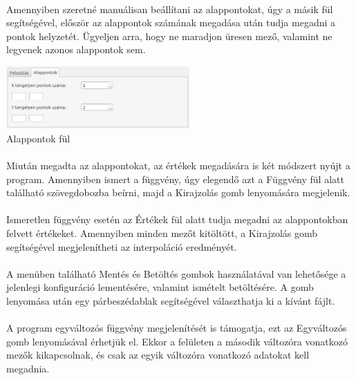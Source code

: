 \documentclass[12pt]{report}
\begin{document}
\paragraph{}
Amennyiben szeretné manuálisan beállítani az alappontokat, úgy a másik fül segítségével, először az alappontok számának megadása után tudja megadni a pontok helyzetét. Ügyeljen arra, hogy ne maradjon üresen mező, valamint ne legyenek azonos alappontok sem.
\begin{center}
\includegraphics[width=7cm]{pics/gui/partition2}  \\
{\footnotesize Alappontok fül} 
\end{center}
\paragraph{}
Miután megadta az alappontokat, az értékek megadására is két módszert nyújt a program. Amennyiben ismert a függvény, úgy elegendő azt a Függvény fül alatt található szövegdobozba beírni, majd a Kirajzolás gomb lenyomására megjelenik.
\paragraph{}
Ismeretlen függvény esetén az Értékek fül alatt tudja megadni az alappontokban felvett értékeket. Amennyiben minden mezőt kitöltött, a Kirajzolás gomb segítségével megjelenítheti az interpoláció eredményét.
\paragraph{}
A menüben található Mentés és Betöltés gombok használatával van lehetősége a jelenlegi konfiguráció lementésére, valamint ismételt betöltésére. A gomb lenyomása után egy párbeszédablak segítségével választhatja ki a kívánt fájlt.
\paragraph{}
A program egyváltozós függvény megjelenítését is támogatja, ezt az Egyváltozós gomb lenyomásával érhetjük el. Ekkor a felületen a második változóra vonatkozó mezők kikapcsolnak, és csak az egyik változóra vonatkozó adatokat kell megadnia.
\end{document}

